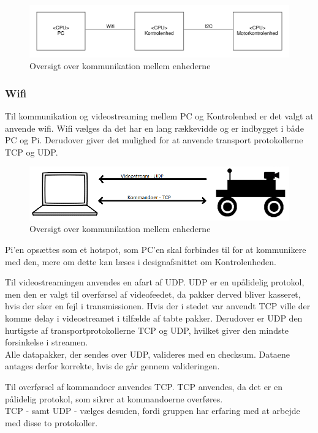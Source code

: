 \begin{figure}[H]
	\centering
	\includegraphics[width = \textwidth]{figur/ProtokolBeskrivelse.pdf}
	\caption{Oversigt over kommunikation mellem enhederne}
	\label{fig:kommunikationsOversigt}
\end{figure}


\subsubsection{Wifi}
Til kommunikation og videostreaming mellem PC og Kontrolenhed er det valgt at anvende wifi. 
Wifi vælges da det har en lang rækkevidde og er indbygget i både PC og Pi. 
Derudover giver det mulighed for at anvende transport protokollerne TCP og UDP.

\begin{figure}[H]
	\centering
	\includegraphics[width = \textwidth]{figur/Design_concept_simple.png}
	\caption{Oversigt over kommunikation mellem enhederne}
	\label{fig:Design_concept_simple}
\end{figure}

Pi'en opsættes som et hotspot, som PC'en skal forbindes til for at kommunikere med den, mere om dette kan læses i designafsnittet om Kontrolenheden.

Til videostreamingen anvendes en afart af UDP. 
UDP er en upålidelig protokol, men den er valgt til overførsel af videofeedet, da pakker derved bliver kasseret, hvis der sker en fejl i transmissionen. 
Hvis der i stedet var anvendt TCP ville der komme delay i videostreamet i tilfælde af tabte pakker. 
Derudover er UDP den hurtigste af transportprotokollerne TCP og UDP, hvilket giver den mindste forsinkelse i streamen. \\
Alle datapakker, der sendes over UDP, valideres med en checksum. 
Dataene antages derfor korrekte, hvis de går gennem valideringen. 

Til overførsel af kommandoer anvendes TCP. 
TCP anvendes, da det er en pålidelig protokol, som sikrer at kommandoerne overføres. \\
TCP - samt UDP - vælges desuden, fordi gruppen har erfaring med at arbejde med disse to protokoller.

